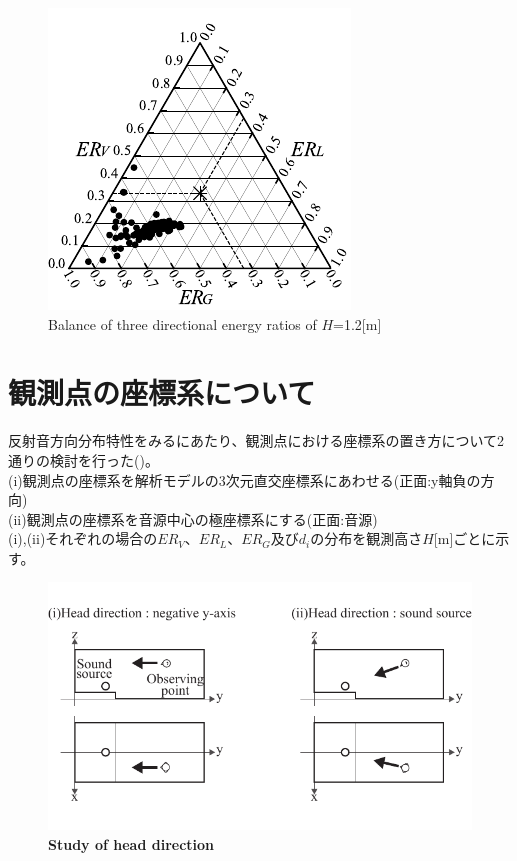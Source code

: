 \begin{figure}[htbp]
    \centering
    \includegraphics[keepaspectratio,scale=1.2]{05_att/rec_Ternary_out_1m.pdf}
    \caption{\hspace{1mm}Balance of three directional energy ratios of $H$=1.2[m]}
    \label{fig:sankaku1}
\end{figure}

\clearpage
\section{観測点の座標系について}
反射音方向分布特性をみるにあたり、観測点における座標系の置き方について2通りの検討を行った()。\\
(i)観測点の座標系を解析モデルの3次元直交座標系にあわせる(正面:y軸負の方向)\\
(ii)観測点の座標系を音源中心の極座標系にする(正面:音源)\\
(i),(ii)それぞれの場合の$ER_V$、$ER_L$、$ER_G$及び$d_i$の分布を観測高さ$H$[m]ごとに示す。

\begin{figure}[htbp]
    \centering
    \includegraphics[keepaspectratio,scale=1]{05_att/observing.pdf}
    \caption{\hspace{1mm}\textbf{Study of head direction}}
    \label{fig:observing}
\end{figure}


